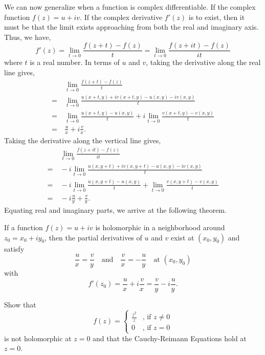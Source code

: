\documentclass[11pt]{article}
\newcommand*{\pd}[3][]{\ensuremath{\frac{^{#1} #2}{ #3^{#1}}}}
\begin{document}
We can now generalize when a function is complex differentiable. If the complex
function $f(z) = u+iv$. If the complex derivative $f'(z)$ is to exist, then it
must be that the limit exists approaching from both the real and imaginary
axis. Thus, we have,
\begin{equation*}
	f'(z)  = \lim_{t\to 0} \frac{f(z+t)-f(z)}{t} = \lim_{t\to 0} \frac{f(z+it)
	- f(z)}{it}
\end{equation*}
where $t$ is a real number. In terms of $u$ and $v$, taking the derivative along
the real line gives,
\begin{align*}
	&\>\lim_{t\to 0} \frac{f(z+t)-f(z)}{t}\\
	=&\> \lim_{t\to 0} \frac{u(x+t,y)+iv(x+t,y)-u(x,y)-iv(x,y)}{t}\\
	=&\> \lim_{t\to 0} \frac{u(x+t,y)-u(x,y)}{t}+i\lim_{t\to 0}
	\frac{v(x+t,y)-v(x,y)}{t}\\
	=&\> \pd{u}{x}+i \pd{v}{x}.
\end{align*}
Taking the derivative along the vertical line gives,
\begin{align*}
	&\>\lim_{t\to 0} \frac{f(z+it)-f(z)}{it}\\
	=&\> -i\lim_{t\to 0} \frac{u(x,y+t)+iv(x,y+t)-u(x,y)-iv(x,y)}{t}\\
	=&\> -i\lim_{t\to 0} \frac{u(x,y+t)-u(x,y)}{t}+\lim_{t\to 0}
	\frac{v(x,y+t)-v(x,y)}{t}\\
	=&\> -i\pd{u}{y}+\pd{v}{y}.
\end{align*}
Equating real and imaginary parts, we arrive at the following theorem.
\begin{theorem} \label{theorem1}
	If a function $f(z) = u+iv$ is holomorphic in a neighborhood around $z_0 =
	x_0+iy_0$, then the partial derivatives of $u$ and $v$ exist at
	$(x_0,y_0)$ and satisfy
	\begin{equation*}
		\pd{u}{x} = \pd{v}{y} \quad \text{and} \quad \pd{v}{x} = -
		\pd{u}{y}\quad\text{at } (x_0,y_0)
	\end{equation*}
	with
	\begin{equation*}
		f'(z_0) = \pd{u}{x}+i \pd{v}{x} = \pd{v}{y}-i\pd{u}{y}.
	\end{equation*}
\end{theorem}
\begin{example}
	Show that
	\begin{equation*}
		f(z) =
		\begin{cases}
			\frac{\bar z^2}{z} & \text{, if } z \neq 0\\
			0 & \text{, if } z = 0
		\end{cases}
	\end{equation*}
	is not holomorphic at $z = 0$ and that the Cauchy-Reimann Equations hold at
	$z = 0$.
\end{example}
\end{document}
